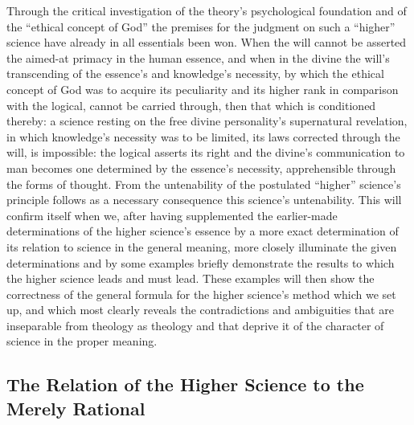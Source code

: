 \documentclass[12pt,a4paper]{book}
\begin{document}
Through the critical investigation of the theory's psychological foundation and of the
``ethical concept of God'' the premises for the judgment on such a ``higher'' science have
already in all essentials been won. When the will cannot be asserted the aimed-at primacy
in the human essence, and when in the divine the will's transcending of the essence's and
knowledge's necessity, by which the ethical concept of God was to acquire its peculiarity
and its higher rank in comparison with the logical, cannot be carried through, then that
which is conditioned thereby: a science resting on the free divine personality's
supernatural revelation, in which knowledge's necessity was to be limited, its laws
corrected through the will, is impossible: the logical asserts its right and the divine's
communication to man becomes one determined by the essence's necessity, apprehensible
through the forms of thought. From the untenability of the postulated ``higher'' science's
principle follows as a necessary consequence this science's untenability. This will confirm
itself when we, after having supplemented the earlier-made determinations of the higher
science's essence by a more exact determination of its relation to science in the general
meaning, more closely illuminate the given determinations and by some examples briefly
demonstrate the results to which the higher science leads and must lead. These examples
will then show the correctness of the general formula for the higher science's method which
we set up, and which most clearly reveals the contradictions and ambiguities that are
inseparable from theology as theology and that deprive it of the character of science in the
proper meaning.

\subsection{The Relation of the Higher Science to the Merely Rational}
\label{ssec:higher-science}
\end{document}
